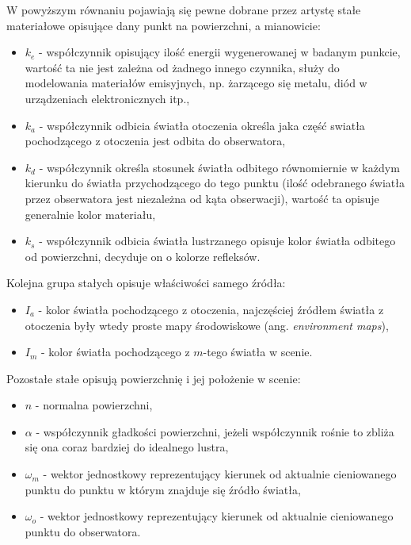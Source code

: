 \documentclass[../main.tex]{subfiles}
\begin{document}
W powyższym równaniu pojawiają się pewne dobrane przez artystę stałe materiałowe opisujące dany punkt na powierzchni, a mianowicie:

\begin{itemize}

\item $k_e$ - współczynnik opisujący ilość energii wygenerowanej w badanym punkcie, wartość ta nie jest zależna od żadnego innego czynnika, służy do modelowania materiałów emisyjnych, np. żarzącego się metalu, diód w urządzeniach elektronicznych itp.,

\item $k_a$ - współczynnik odbicia światła otoczenia określa jaka część swiatła pochodzącego z otoczenia jest odbita do obserwatora, 

\item $k_d$ - współczynnik określa stosunek światła odbitego równomiernie w każdym kierunku do światła przychodzącego do tego punktu (ilość odebranego światła przez obserwatora jest niezależna od kąta obserwacji), wartość ta opisuje generalnie kolor materiału,

\item $k_s$ - współczynnik odbicia światła lustrzanego opisuje kolor światła odbitego od powierzchni, decyduje on o kolorze refleksów.

\end{itemize}

\noindent Kolejna grupa stałych opisuje właściwości samego źródła:

\begin{itemize}
    \item $I_a$ - kolor światła pochodzącego z otoczenia, najczęściej źródłem światła z otoczenia były wtedy proste mapy środowiskowe (ang. \textit{environment maps}),
    \item $I_m$ - kolor światła pochodzącego z $m$-tego światła w scenie.
\end{itemize}

\noindent Pozostałe stałe opisują powierzchnię i jej położenie w scenie:

\begin{itemize}
    \item $n$ - normalna powierzchni,
    \item $\alpha$ - współczynnik gładkości powierzchni, jeżeli współczynnik rośnie to zbliża się ona coraz bardziej do idealnego lustra,
    \item $\omega_m$ - wektor jednostkowy reprezentujący kierunek od aktualnie cieniowanego punktu do punktu w którym znajduje się źródło światła,
    \item $\omega_o$ - wektor jednostkowy reprezentujący kierunek od aktualnie cieniowanego punktu do obserwatora.
\end{itemize}
\end{document}
